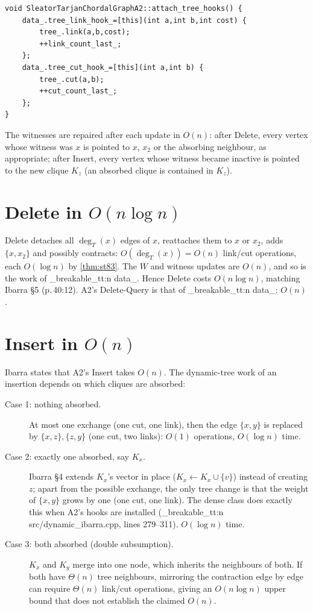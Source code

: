 \documentclass[11pt,a4paper,oneside]{report}
\theoremstyle{plain}
\theoremstyle{definition}
\theoremstyle{remark}
\newcommand{\op}[1]{\textsf{#1}}
\DeclareRobustCommand{\code}[1]{\mtp_breakable_tt:n {#1}}
\DeclareRobustCommand{\file}[1]{\mtp_breakable_tt:n {#1}}
\begin{document}
\begin{lstlisting}[style=cpp,firstnumber=47,caption={\file{src/dynamic_ibarra_a2.cpp}, lines 47--56: mirroring clique-tree changes into the dynamic tree.},label={lst:a2-hooks}]
void SleatorTarjanChordalGraphA2::attach_tree_hooks() {
    data_.tree_link_hook_=[this](int a,int b,int cost) {
        tree_.link(a,b,cost);
        ++link_count_last_;
    };
    data_.tree_cut_hook_=[this](int a,int b) {
        tree_.cut(a,b);
        ++cut_count_last_;
    };
}
\end{lstlisting}

\noindent The witnesses are repaired after each update in \(O(n)\): after \op{Delete}, every
vertex whose witness was \(x\) is pointed to \(x\), \(x_2\) or the absorbing neighbour, as
appropriate; after \op{Insert}, every vertex whose witness became inactive is pointed to the
new clique \(K_z\) (an absorbed clique is contained in \(K_z\)).

\section{Delete in \texorpdfstring{\(O(n\log n)\)}{O(n log n)}}
\op{Delete} detaches all \(\deg_T(x)\) edges of \(x\), reattaches them to \(x\) or \(x_2\),
adds \(\{x,x_2\}\) and possibly contracts: \(O(\deg_T(x))=O(n)\) link/cut operations, each
\(O(\log n)\) by \cref{thm:st83}. The \(W\) and witness updates are \(O(n)\), and so is the work
of \code{data_}. Hence \op{Delete} costs \(O(n\log n)\), matching Ibarra \S5 (p.\,40:12). A2's
\op{Delete-Query} is that of \code{data_}: \(O(n)\).

\section{Insert in \texorpdfstring{\(O(n)\)}{O(n)}}\label{sec:a2-insert-on}
Ibarra states that A2's \op{Insert} takes \(O(n)\). The dynamic-tree work of an insertion
depends on which cliques are absorbed:
\begin{description}
\item[Case 1: nothing absorbed.] At most one exchange (one cut, one link), then the edge
  \(\{x,y\}\) is replaced by \(\{x,z\},\{z,y\}\) (one cut, two links): \(O(1)\) operations,
  \(O(\log n)\) time.
\item[Case 2: exactly one absorbed, say \(K_x\).] Ibarra \S4 extends \(K_x\)'s vector in place
  (\(K_x\leftarrow K_x\cup\{v\}\)) instead of creating \(z\); apart from the possible exchange,
  the only tree change is that the weight of \(\{x,y\}\) grows by one (one cut, one link). The dense class does exactly this when
  A2's hooks are installed (\file{src/dynamic_ibarra.cpp}, lines 279--311). \(O(\log n)\) time.
\item[Case 3: both absorbed (double subsumption).] \(K_x\) and \(K_y\) merge into one node, which
  inherits the neighbours of both. If both have \(\Theta(n)\) tree neighbours, mirroring the
  contraction edge by edge can require \(\Theta(n)\) link/cut operations, giving an
  \(O(n\log n)\) upper bound that does not establish the claimed \(O(n)\).
\end{description}
\end{document}
